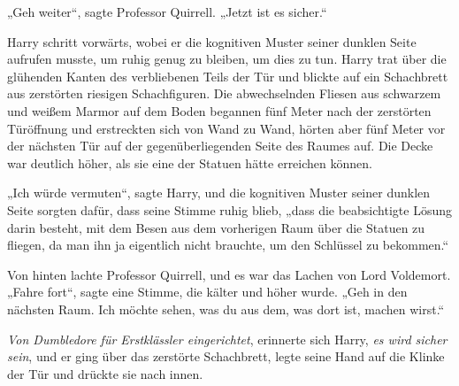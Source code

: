 „Geh weiter“, sagte Professor Quirrell. „Jetzt ist es sicher.“

Harry schritt vorwärts, wobei er die kognitiven Muster seiner dunklen Seite aufrufen musste, um ruhig genug zu bleiben, um dies zu tun. Harry trat über die glühenden Kanten des verbliebenen Teils der Tür und blickte auf ein Schachbrett aus zerstörten riesigen Schachfiguren. Die abwechselnden Fliesen aus schwarzem und weißem Marmor auf dem Boden begannen fünf Meter nach der zerstörten Türöffnung und erstreckten sich von Wand zu Wand, hörten aber fünf Meter vor der nächsten Tür auf der gegenüberliegenden Seite des Raumes auf. Die Decke war deutlich höher, als sie eine der Statuen hätte erreichen können.

„Ich würde vermuten“, sagte Harry, und die kognitiven Muster seiner dunklen Seite sorgten dafür, dass seine Stimme ruhig blieb, „dass die beabsichtigte Lösung darin besteht, mit dem Besen aus dem vorherigen Raum über die Statuen zu fliegen, da man ihn ja eigentlich nicht brauchte, um den Schlüssel zu bekommen.“

Von hinten lachte Professor Quirrell, und es war das Lachen von Lord Voldemort.
„Fahre fort“, sagte eine Stimme, die kälter und höher wurde. „Geh in den nächsten Raum. Ich möchte sehen, was du aus dem, was dort ist, machen wirst.“

\emph{Von Dumbledore für Erstklässler eingerichtet}, erinnerte sich Harry, \emph{es \emph{wird} sicher sein}, und er ging über das zerstörte Schachbrett, legte seine Hand auf die Klinke der Tür und drückte sie nach innen.


